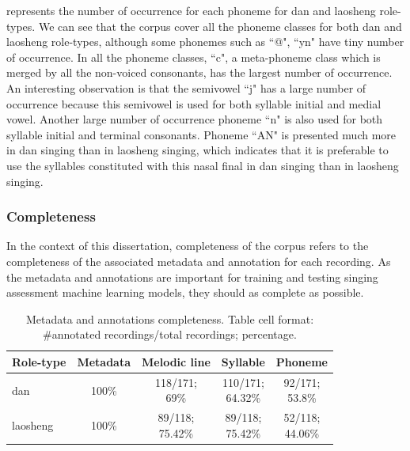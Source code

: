  represents the number of occurrence for each phoneme for dan and laosheng role-types. We can see that the corpus cover all the phoneme classes for both dan and laosheng role-types, although some phonemes such as ``@", ``yn" have tiny number of occurrence. In all the phoneme classes, ``c", a meta-phoneme class which is merged by all the non-voiced consonants, has the largest number of occurrence. An interesting observation is that the semivowel ``j" has a large number of occurrence because this semivowel is used for both syllable initial and medial vowel. Another large number of occurrence phoneme ``n" is also used for both syllable initial and terminal consonants. Phoneme ``AN" is presented much more in dan singing than in laosheng singing, which indicates that it is preferable to use the syllables constituted with this nasal final in dan singing than in laosheng singing.

\subsubsection{Completeness}

In the context of this dissertation, completeness of the corpus refers to the completeness of the associated metadata and annotation for each recording. As the metadata and annotations are important for training and testing singing assessment machine learning models, they should as complete as possible. 

\begin{table}[ht]
    \centering
    \begin{tabular}{l|cccc}
        \toprule
        Role-type & Metadata & Melodic line & Syllable & Phoneme \\
        \midrule
        dan           & 100\% & \makecell{118/171;\\69\%} 	& \makecell{110/171;\\64.32\%} 	& \makecell{92/171;\\53.8\%} \\
        \hline
        laosheng      & 100\% & \makecell{89/118;\\75.42\%} & \makecell{89/118;\\75.42\%} 	& \makecell{52/118;\\44.06\%} \\
        \bottomrule
    \end{tabular}
    \caption{Metadata and annotations completeness. Table cell format: \#annotated recordings/total recordings; percentage.}
    \label{table:ch4:metadata_completeness}
\end{table}

